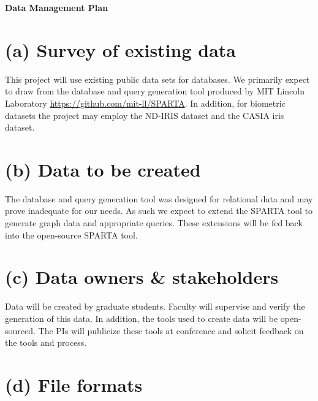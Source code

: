 \documentclass[11pt]{article}
\begin{document}
\newcommand{\etalchar}[1]{$^{#1}$}

$\mbox{ }$


\begin{center}
{\Large \bf Data Management Plan}
\end{center}



\noindent
\section*{(a) Survey of existing data}
This project will use existing public data sets for databases.  We primarily expect to draw from the database and query generation tool produced by MIT Lincoln Laboratory \url{https://github.com/mit-ll/SPARTA}.  In addition, for biometric datasets the project may employ the ND-IRIS dataset and the CASIA iris dataset.
\noindent
\section*{(b) Data to be created}

The database and query generation tool was designed for relational data and may prove inadequate for our needs.  As such we expect to extend the SPARTA tool to generate graph data and appropriate queries.  These extensions will be fed back into the open-source SPARTA tool.

\noindent
\section*{(c) Data owners \& stakeholders}
Data will be created by graduate students.  Faculty will supervise and verify the generation of this data.  In addition, the tools used to create data will be open-sourced.  The PIs will publicize these tools at conference and solicit feedback on the tools and process.

\noindent
\section*{(d) File formats}
\end{document}

